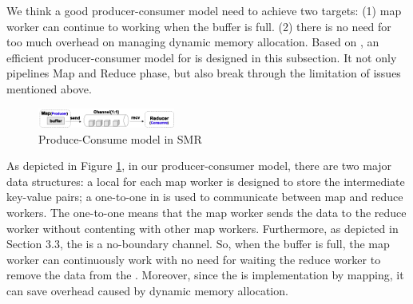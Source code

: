We think a good producer-consumer model need to achieve two targets:
(1) map worker can continue to working when the buffer is full.
(2) there is no need for too much overhead on managing dynamic memory allocation.
Based on \myth, an efficient producer-consumer model for \myds is designed in this subsection.
It not only pipelines Map and Reduce phase, but also break through the limitation of issues  mentioned above. 

\begin{figure}[!h!t]  
	\centering
	\includegraphics[width=0.4\textwidth]{eps/dmr_channel.eps}
	\caption{Produce-Consume model in SMR}
	\label{fig:dmr:channel}
\end{figure}

As depicted in Figure \ref{fig:dmr:channel}, in our producer-consumer model, there are two major data structures:
a local  for each map worker is designed to store the intermediate key-value pairs; 
a one-to-one  in \myth is used to communicate between map and reduce workers.
The one-to-one  means that the map worker sends the data to the reduce worker without contenting with other map workers.
Furthermore, as depicted in Section 3.3, the  is a no-boundary channel.
So, when the  buffer is full, the map worker can continuously work with no need for waiting the reduce worker to remove the data from the .
Moreover, since the  is implementation by mapping, it can save overhead caused by dynamic memory allocation.



